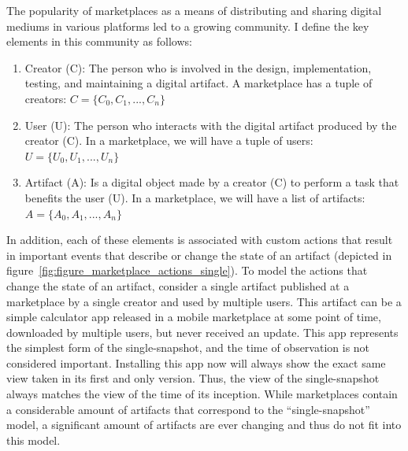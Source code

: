 The popularity of marketplaces as a means of distributing and sharing digital mediums in various platforms led to a growing community.
I define the key elements in this community as follows:
\begin{enumerate}
\item Creator (C): The person who is involved in the design, implementation, testing, and maintaining a digital artifact. A marketplace has a tuple of creators: $C=\{C_0, C_1,..., C_n\}$
\item User (U): The person who interacts with the digital artifact produced by the creator (C). In a marketplace, we will have a tuple of users: $U=\{U_0, U_1,..., U_n\}$
\item Artifact (A): Is a digital object made by a creator (C) to perform a task that benefits the user (U). In a marketplace, we will have a list of artifacts: $A=\{A_0, A_1,..., A_n\}$
\end{enumerate}
In addition, each of these elements is associated with custom actions that result in important events that describe or change the state of an artifact (depicted in figure~\ref{fig:figure_marketplace_actions_single}).
To model the actions that change the state of an artifact, consider a single artifact published at a marketplace by a single creator and used by multiple users.
This artifact can be a simple calculator app released in a mobile marketplace at some point of time, downloaded by multiple users, but never received an update.
This app represents the simplest form of the single-snapshot, and the time of observation is not considered important.
Installing this app now will always show the exact same view taken in its first and only version.
Thus, the view of the single-snapshot always matches the view of the time of its inception.
While marketplaces contain a considerable amount of artifacts that correspond to the ``single-snapshot'' model, a significant amount of artifacts are ever changing and thus do not fit into this model.

